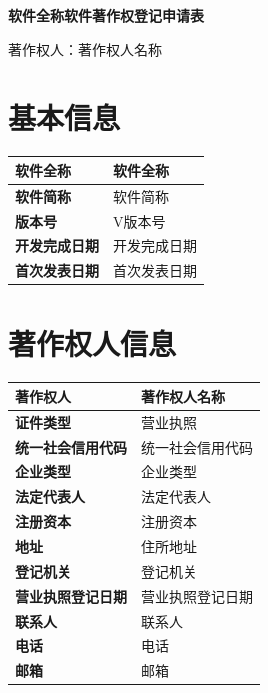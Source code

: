 \documentclass[a4paper,12pt]{article}
\begin{document}
\begin{center}
  {\LARGE\bfseries {{软件全称}}\quad 软件著作权登记申请表}

  \vspace{0.8em}
  {\large 著作权人：{{著作权人名称}}}
\end{center}

\vspace{1.5em}

\section{基本信息}

\begin{center}
\begin{tabularx}{\textwidth}{|l|L|}
\hline
\textbf{软件全称} & {{软件全称}} \\
\hline
\textbf{软件简称} & {{软件简称}} \\
\hline
\textbf{版本号} & V{{版本号}} \\
\hline
\textbf{开发完成日期} & {{开发完成日期}} \\
\hline
\textbf{首次发表日期} & {{首次发表日期}} \\
\hline
\end{tabularx}
\end{center}


\section{著作权人信息}

\begin{center}
\begin{tabularx}{\textwidth}{|l|L|}
\hline
\textbf{著作权人} & {{著作权人名称}} \\
\hline
\textbf{证件类型} & 营业执照 \\
\hline
\textbf{统一社会信用代码} & {{统一社会信用代码}} \\
\hline
\textbf{企业类型} & {{企业类型}} \\
\hline
\textbf{法定代表人} & {{法定代表人}} \\
\hline
\textbf{注册资本} & {{注册资本}} \\
\hline
\textbf{地址} & {{住所地址}} \\
\hline
\textbf{登记机关} & {{登记机关}} \\
\hline
\textbf{营业执照登记日期} & {{营业执照登记日期}} \\
\hline
\textbf{联系人} & {{联系人}} \\
\hline
\textbf{电话} & {{电话}} \\
\hline
\textbf{邮箱} & {{邮箱}} \\
\hline
\end{tabularx}
\end{center}
\end{document}
